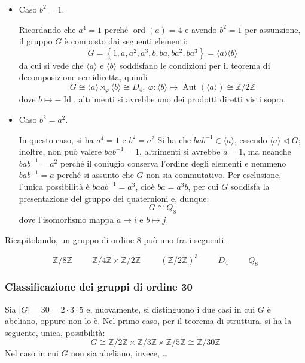 \documentclass[12pt]{scrartcl}
\theoremstyle{style}
\newenvironment{boxenv}[1][]{
    \begin{eqbox}[#1]
    }{
   \end{eqbox}
}
\numberwithin{equation}{subsection}
\begin{document}
\begin{itemize}
	\item Caso $b^2 = 1$.

		Ricordando che $a^4 = 1$ perch\'e $\operatorname{ord}(a) = 4$ e avendo $b^2 = 1$ per assunzione, il gruppo $G$ \`e composto dai seguenti elementi:
		\[
		G = \left\{ 1 , a , a^2 , a^3, b , ba , ba^2 , ba^3 \right\}  = \langle a \rangle\langle b \rangle
		\] 
		da cui si vede che $\langle a \rangle$ e $\langle b \rangle$  soddisfano le condizioni per il teorema di decomposizione semidiretta, quindi
		\[
			G \cong \langle a \rangle \rtimes_\varphi  \langle b \rangle\cong D_{4} , \ \varphi : \langle b \rangle \longmapsto \operatorname{Aut} (\langle a \rangle)\cong \mathbb{Z}/2\mathbb{Z} 
		\] 
		dove $b\mapsto -\operatorname{Id} $, altrimenti si avrebbe uno dei prodotti diretti visti sopra.
	\item Caso $b^2 = a^2$.

		In questo caso, si ha $a^4 = 1 $ e $b^2 = a^2$
		Si ha che $bab^{-1}\in \langle a \rangle$, essendo $\langle a \rangle\lhd G$; inoltre, non pu\`o valere $bab^{-1}=1$, altrimenti si avrebbe $a=1$, ma neanche $bab^{-1}=a^2$ perch\'e il coniugio conserva l'ordine degli elementi e nemmeno $bab^{-1}=a$ perch\'e si assunto che $G$ non sia commutativo.
		Per esclusione, l'unica possibilit\`a \`e $baab^{-1}= a^3$, cio\`e $ba= a^3 b$, per cui $G$ soddisfa la presentazione del gruppo dei quaternioni e, dunque:
		\[
		G \cong Q_8
		\] 
		dove l'isomorfismo mappa $a \mapsto i$ e $b\mapsto j$.
\end{itemize}
Ricapitolando, un gruppo di ordine $8$ pu\`o uno fra i seguenti:
\begin{boxenv}[]
\[
\mathbb{Z}/8\mathbb{Z} \hspace{1cm} \mathbb{Z}/4\mathbb{Z} \times \mathbb{Z}/2\mathbb{Z} \hspace{1cm} (\mathbb{Z}/2\mathbb{Z})^3 \hspace{1cm} D_4 \hspace{1cm}Q_8
\] 
\end{boxenv}

\subsubsection{Classificazione dei gruppi di ordine 30}
Sia $\lvert G \rvert  = 30 = 2\cdot 3\cdot 5$ e, nuovamente, si distinguono i due casi in cui $G$ \`e abeliano, oppure non lo \`e.
Nel primo caso, per il teorema di struttura, si ha la seguente, unica, possibilit\`a:
\[
G \cong \mathbb{Z}/2\mathbb{Z}\times  \mathbb{Z}/3\mathbb{Z}\times \mathbb{Z}/5\mathbb{Z} \cong \mathbb{Z}/30\mathbb{Z}
\] 
Nel caso in cui $G$ non sia abeliano, invece, \ldots
\end{document}
